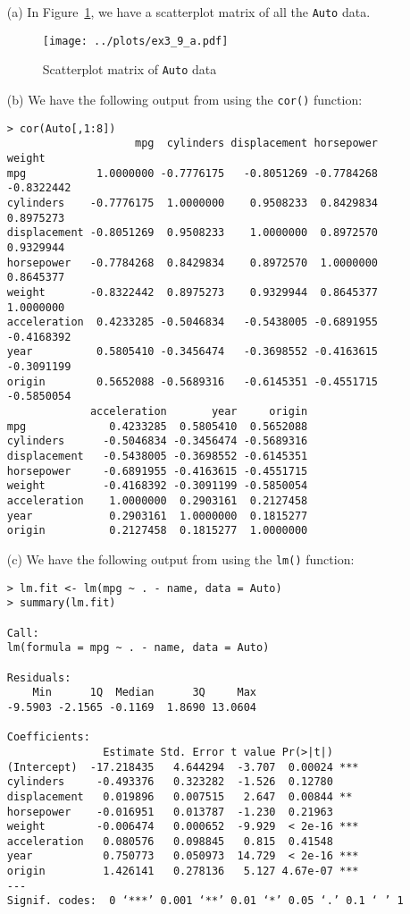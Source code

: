 
\begin{itemize}
    \item[(a)] In Figure~\ref{fig3_9scat}, we have a scatterplot matrix of all the 
        \verb|Auto| data.
        \begin{figure}[!ht]
            \texttt{[image: ../plots/ex3\_9\_a.pdf]}
            \caption{Scatterplot matrix of \texttt{Auto} data \label{fig3_9scat}}
        \end{figure}
    \item[(b)] We have the following output from using the \verb|cor()| function:
        \scriptsize\begin{verbatim}
> cor(Auto[,1:8])
                    mpg  cylinders displacement horsepower     weight
mpg           1.0000000 -0.7776175   -0.8051269 -0.7784268 -0.8322442
cylinders    -0.7776175  1.0000000    0.9508233  0.8429834  0.8975273
displacement -0.8051269  0.9508233    1.0000000  0.8972570  0.9329944
horsepower   -0.7784268  0.8429834    0.8972570  1.0000000  0.8645377
weight       -0.8322442  0.8975273    0.9329944  0.8645377  1.0000000
acceleration  0.4233285 -0.5046834   -0.5438005 -0.6891955 -0.4168392
year          0.5805410 -0.3456474   -0.3698552 -0.4163615 -0.3091199
origin        0.5652088 -0.5689316   -0.6145351 -0.4551715 -0.5850054
             acceleration       year     origin
mpg             0.4233285  0.5805410  0.5652088
cylinders      -0.5046834 -0.3456474 -0.5689316
displacement   -0.5438005 -0.3698552 -0.6145351
horsepower     -0.6891955 -0.4163615 -0.4551715
weight         -0.4168392 -0.3091199 -0.5850054
acceleration    1.0000000  0.2903161  0.2127458
year            0.2903161  1.0000000  0.1815277
origin          0.2127458  0.1815277  1.0000000
        \end{verbatim}\normalsize
    \item[(c)] We have the following output from using the \verb|lm()| function:
        \small\begin{verbatim}
> lm.fit <- lm(mpg ~ . - name, data = Auto)
> summary(lm.fit)

Call:
lm(formula = mpg ~ . - name, data = Auto)

Residuals:
    Min      1Q  Median      3Q     Max 
-9.5903 -2.1565 -0.1169  1.8690 13.0604 

Coefficients:
               Estimate Std. Error t value Pr(>|t|)    
(Intercept)  -17.218435   4.644294  -3.707  0.00024 ***
cylinders     -0.493376   0.323282  -1.526  0.12780    
displacement   0.019896   0.007515   2.647  0.00844 ** 
horsepower    -0.016951   0.013787  -1.230  0.21963    
weight        -0.006474   0.000652  -9.929  < 2e-16 ***
acceleration   0.080576   0.098845   0.815  0.41548    
year           0.750773   0.050973  14.729  < 2e-16 ***
origin         1.426141   0.278136   5.127 4.67e-07 ***
---
Signif. codes:  0 ‘***’ 0.001 ‘**’ 0.01 ‘*’ 0.05 ‘.’ 0.1 ‘ ’ 1


\end{verbatim}
\end{itemize}
